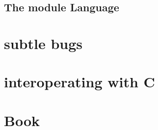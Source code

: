 \documentclass[svgnames,12pt,a4paper]{report}
\begin{document}
\section{The module Language}
\label{sec:module-language}


\chapter{subtle bugs}
\label{sec:subtle-bugs}


\chapter{interoperating with C}
\label{sec:inter-with-c}



\chapter{Book}










\end{document}
